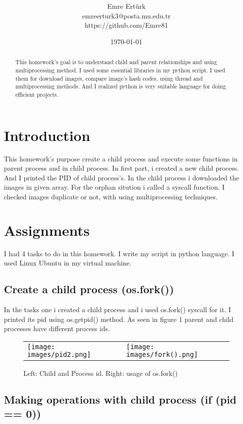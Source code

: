 \documentclass[onecolumn]{article}
\title{\spacecaps{Assignment Report 1: Process and Thread Implementation}\\ \normalsize \spacesc{CENG2034, Operating Systems} }
\author{Emre Ertürk\\emreerturk3@posta.mu.edu.tr\\https://github.com/Emre81}
\date{\today}
\begin{document}
\maketitle

\begin{abstract}
This homework's goal is to understand child and parent relationships and using multiprocessing method. I used some essential libraries in my python script. I used them for download images, compare image's hash codes, using thread and multiprocessing methods. And I realized python is very suitable language for doing efficient projects.
\end{abstract}


\section{Introduction}
This homework's purpose create a child process and execute some functions in parent process and in child process. In first part, i created a new child process. And I printed the PID of child process's. In the child process i downloaded the images in given array. For the orphan sitution i called a syscall function. I checked images duplicate or not, with using multiprocessing techniques.

\section{Assignments}
I had 4 tasks to do in this homework. I write my script in python language. I used Linux Ubuntu in my virtual machine.

\subsection{Create a child process (os.fork())}

In the tasks one i created a child process and i used os.fork() syscall for it. I printed its pid using os.getpid()
method. As seen in figure 1 parent and child processes have different process ids.

\begin{figure}[h]
\begin{tabular}{ll}
\texttt{[image: images/pid2.png]}
&
\texttt{[image: images/fork().png]}
\end{tabular}
\caption{Left: Child and Process id. 
Right: usage of os.fork()}
\label{Fig:Race}
\end{figure}

\subsection{Making operations with child process (if (pid == 0))}
\end{document}
